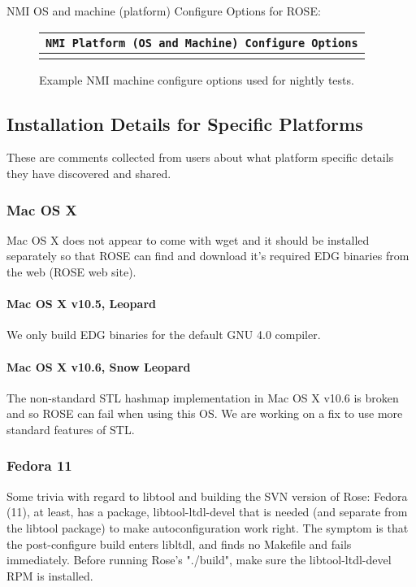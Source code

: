    NMI OS and machine (platform) Configure Options for ROSE:
{\indent
\begin{latexonly}
\begin{figure}[tb]
\begin{center}
\begin{tabular}{|c|} \hline
     {\tt NMI Platform (OS and Machine) Configure Options}
\\\hline\hline
{
\scriptsize
   
}
\\\hline
\end{tabular}
\end{center}
\caption{ Example NMI machine configure options used for nightly tests. }
\end{figure}
\end{latexonly}
\label{NMI:configureOptions}
}

\subsection{Installation Details for Specific Platforms}

   These are comments collected from users about what 
platform specific details they have discovered and shared.

\subsubsection{Mac OS X}
   Mac OS X does not appear to come with wget and it should be installed
separately so that ROSE can find and download it's required EDG 
binaries from the web (ROSE web site).

\paragraph{Mac OS X v10.5, Leopard}
   We only build EDG binaries for the default GNU 4.0 compiler.

\paragraph{Mac OS X v10.6, Snow Leopard}
   The non-standard STL hashmap implementation in Mac OS X v10.6 is broken and so ROSE
can fail when using this OS.  We are working on a fix to use more standard
features of STL.

\subsubsection{Fedora 11}
   Some trivia with regard to libtool and building the SVN version of Rose:
Fedora (11), at least, has a package, libtool-ltdl-devel that is needed (and separate from
the libtool package) to make autoconfiguration work right.  The symptom is that the
post-configure build enters libltdl, and finds no Makefile and fails immediately.
Before running Rose's "./build", make sure the libtool-ltdl-devel RPM is installed.

